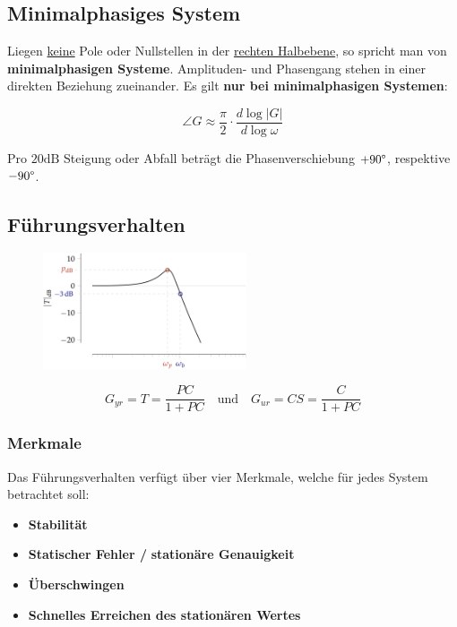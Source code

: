 \documentclass[
  10pt,
  a4paper,
  twocolumn]{article}
\providecommand{\tightlist}{%
  \setlength{\itemsep}{0pt}\setlength{\parskip}{0pt}}\usepackage{longtable,booktabs,array}
\numberwithin{equation}{section}
\begin{document}
\hypertarget{minimalphasiges-system}{%
\subsection{Minimalphasiges System}\label{minimalphasiges-system}}

Liegen \ul{keine} Pole oder Nullstellen in der \ul{rechten Halbebene},
so spricht man von \textbf{minimalphasigen Systeme}. Amplituden- und
Phasengang stehen in einer direkten Beziehung zueinander. Es gilt
\textbf{nur bei minimalphasigen Systemen}:

\[
\angle{G}\approx\frac{\pi}{2}\cdot\frac{d{\log\lvert G\rvert}}{d{\log{\omega}}}
\]

Pro \(20\text{dB}\) Steigung oder Abfall beträgt die Phasenverschiebung
\(+90\degree\), respektive \(-90\degree\).

\hypertarget{fuxfchrungsverhalten}{%
\subsection{Führungsverhalten}\label{fuxfchrungsverhalten}}

\begin{figure}[H]

{\centering \includegraphics[width=6cm,height=\textheight]{images/paste-35.png}

}

\end{figure}

\[
G_{yr}=T=\frac{PC}{1+PC}\quad\text{und}\quad G_{ur}=CS=\frac{C}{1+PC}
\]

\hypertarget{merkmale}{%
\subsubsection{Merkmale}\label{merkmale}}

Das Führungsverhalten verfügt über vier Merkmale, welche für jedes
System betrachtet soll:

\begin{itemize}
\tightlist
\item
  \textbf{Stabilität}
\item
  \textbf{Statischer Fehler /} \textbf{stationäre Genauigkeit}
\item
  \textbf{Überschwingen}
\item
  \textbf{Schnelles Erreichen des stationären Wertes}
\end{itemize}
\end{document}
